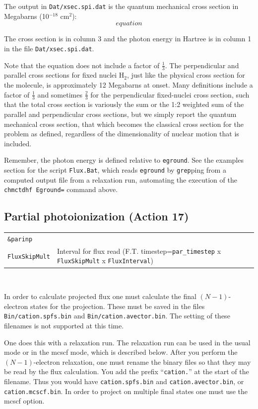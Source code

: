 \documentclass[10pt,leqno, oneside]{book}
\begin{document}
The output in \verb#Dat/xsec.spi.dat# is the quantum mechanical cross section in Megabarns (10$^{-18}$ cm$^{2}$):
\begin{equation}
equation
\end{equation}

The cross section is in column 3 and the photon energy in Hartree is in column 1 in the file \verb#Dat/xsec.spi.dat#.

Note that the equation does not include a factor of $\frac{1}{3}$.  The perpendicular and parallel cross sections for fixed nuclei H$_2$,
just like the physical cross section for the molecule, is approximately 12 Megabarns at onset.  Many definitions include a factor of $\frac{1}{3}$
and sometimes $\frac{2}{3}$ for the perpendicular fixed-nuclei cross section, such that the total cross section is variously the sum or the
1:2 weighted sum of the parallel and perpendicular cross sections, but we simply report the
quantum mechanical cross section, that which becomes the classical cross section for the problem as defined, 
regardless of the dimensionality of nuclear motion that is included.

Remember, the photon energy is defined relative to \verb#eground#.  See the examples section for the script \verb#Flux.Bat#, which reads
\verb#eground# by \verb#grep#ping from a computed output file from a relaxation run, automating the execution of the 
\verb#chmctdhf Eground=# command above.

\subsection{Partial photoionization (Action 17)}

{\footnotesize
\begin{tabular}{ll}
\verb#&parinp# \\
\verb#FluxSkipMult#  & Interval for flux read (F.T. timestep=\verb#par_timestep# x \verb#FluxSkipMult# x \verb#FluxInterval#) \\
\end{tabular}}

\

In order to calculate projected flux one must calculate the final $(N-1)$-electron states for the projection.  These must be saved in
the files \verb#Bin/cation.spfs.bin# and \verb#Bin/cation.avector.bin#.  The setting of these filenames is not supported at this time.

One does this with a relaxation run.
The relaxation run can be used in the usual mode or in the mcscf mode, which is described below.  After you perform the $(N-1)$-electron
relaxation, one must rename the binary files so that they may be read by the flux calculation.  You add the prefix ``\verb#cation.#'' at the start
of the filename.  Thus you would have \verb#cation.spfs.bin# and \verb#cation.avector.bin#, or \verb#cation.mcscf.bin#.   In order to project
on multiple final states one must use the mcscf option.
\end{document}
